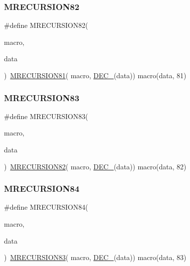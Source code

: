 \subsubsection{\texorpdfstring{MRECURSION82}{MRECURSION82}}
{\footnotesize\ttfamily \#define M\+R\+E\+C\+U\+R\+S\+I\+O\+N82(\begin{DoxyParamCaption}\item[{}]{macro,  }\item[{}]{data }\end{DoxyParamCaption})~\mbox{\hyperlink{group__group__sam0__utils__mrecursion_gaa8cd222526861d88895eed35926c7745}{M\+R\+E\+C\+U\+R\+S\+I\+O\+N81}}(  macro, \mbox{\hyperlink{group__group__sam0__utils__mrecursion_ga1d23d683797679dca8c3512a54a5dcae}{D\+E\+C\+\_\+}}(data))   macro(data, 81)}

\mbox{\label{group__group__sam0__utils__mrecursion_ga1f2ba2104038509ab3e8b791d2d21777}} 
\subsubsection{\texorpdfstring{MRECURSION83}{MRECURSION83}}
{\footnotesize\ttfamily \#define M\+R\+E\+C\+U\+R\+S\+I\+O\+N83(\begin{DoxyParamCaption}\item[{}]{macro,  }\item[{}]{data }\end{DoxyParamCaption})~\mbox{\hyperlink{group__group__sam0__utils__mrecursion_ga8ba880263ec8b032074474cb8514ef0c}{M\+R\+E\+C\+U\+R\+S\+I\+O\+N82}}(  macro, \mbox{\hyperlink{group__group__sam0__utils__mrecursion_ga1d23d683797679dca8c3512a54a5dcae}{D\+E\+C\+\_\+}}(data))   macro(data, 82)}

\mbox{\label{group__group__sam0__utils__mrecursion_ga31ee69249c9a70670bb46444ee959831}} 
\subsubsection{\texorpdfstring{MRECURSION84}{MRECURSION84}}
{\footnotesize\ttfamily \#define M\+R\+E\+C\+U\+R\+S\+I\+O\+N84(\begin{DoxyParamCaption}\item[{}]{macro,  }\item[{}]{data }\end{DoxyParamCaption})~\mbox{\hyperlink{group__group__sam0__utils__mrecursion_ga1f2ba2104038509ab3e8b791d2d21777}{M\+R\+E\+C\+U\+R\+S\+I\+O\+N83}}(  macro, \mbox{\hyperlink{group__group__sam0__utils__mrecursion_ga1d23d683797679dca8c3512a54a5dcae}{D\+E\+C\+\_\+}}(data))   macro(data, 83)}

